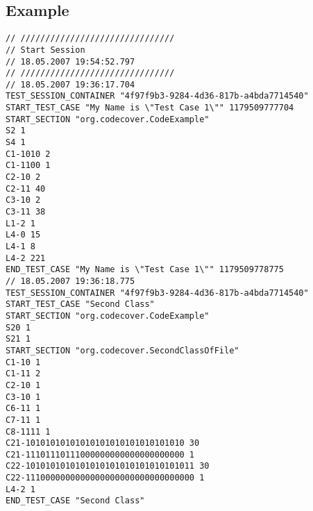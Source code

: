 \subsection{Example}
\begin{footnotesize}
\begin{verbatim}
// ///////////////////////////////
// Start Session
// 18.05.2007 19:54:52.797
// ///////////////////////////////
// 18.05.2007 19:36:17.704
TEST_SESSION_CONTAINER "4f97f9b3-9284-4d36-817b-a4bda7714540"
START_TEST_CASE "My Name is \"Test Case 1\"" 1179509777704
START_SECTION "org.codecover.CodeExample"
S2 1
S4 1
C1-1010 2
C1-1100 1
C2-10 2
C2-11 40
C3-10 2
C3-11 38
L1-2 1
L4-0 15
L4-1 8
L4-2 221
END_TEST_CASE "My Name is \"Test Case 1\"" 1179509778775
// 18.05.2007 19:36:18.775
TEST_SESSION_CONTAINER "4f97f9b3-9284-4d36-817b-a4bda7714540"
START_TEST_CASE "Second Class"
START_SECTION "org.codecover.CodeExample"
S20 1
S21 1
START_SECTION "org.codecover.SecondClassOfFile"
C1-10 1
C1-11 2
C2-10 1
C3-10 1
C6-11 1
C7-11 1
C8-1111 1
C21-10101010101010101010101010101010 30
C21-11101110111000000000000000000000 1
C22-1010101010101010101010101010101011 30
C22-1110000000000000000000000000000000 1
L4-2 1
END_TEST_CASE "Second Class"
\end{verbatim}
\end{footnotesize}